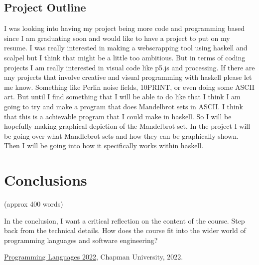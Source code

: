 \documentclass{article}
\theoremstyle{theorem}
\theoremstyle{definition}
\theoremstyle{remark}
\begin{document}
\subsection{Project Outline }
I was looking into having my project being more code and programming based since I am graduating soon and would like to have a project to put on my resume. I was really interested in making a webscrapping tool using haskell and scalpel but I think that might be a little too ambitious. But in terms of coding projects I am really interested in visual code like p5.js and processing. If there are any projects that involve creative and visual programming with haskell please let me know. Something like Perlin noise fields, 10PRINT, or even doing some ASCII art. But until I find something that I will be able to do like that I think I am going to try and make a program that does Mandelbrot sets in ASCII. I think that this is a achievable program that I could make in haskell. So I will be hopefully making graphical depiction of the Mandelbrot set. In the project I will be going over what Mandlebrot sets and how they can be graphically shown. Then I will be going into how it specifically works within haskell.

\section{Conclusions}\label{conclusions}

(approx 400 words)

In the conclusion, I want a critical reflection on the content of the course. Step back from the technical details. How does the course fit into the wider world of programming languages and software engineering?

\begin{thebibliography}{99}
 \href{https://github.com/alexhkurz/programming-languages-2022/blob/main/README.md}{Programming Languages 2022}, Chapman University, 2022.
\end{thebibliography}
\end{document}
